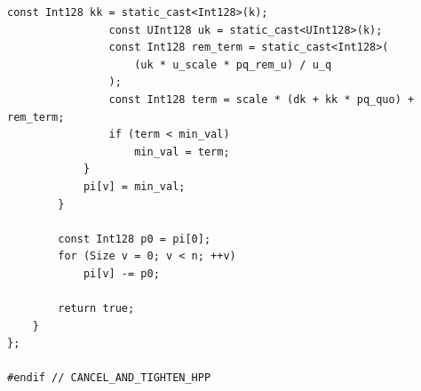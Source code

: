 \begin{lstlisting}[caption={Implementação em C++ do algoritmo \textit{Cancel-and-Tighten} com ordenação topológica em DAG admissível e aperto via algoritmo de Karp.}, label={lst:cancel_and_tighten}]
				const Int128 kk = static_cast<Int128>(k);
				const UInt128 uk = static_cast<UInt128>(k);
				const Int128 rem_term = static_cast<Int128>(
				    (uk * u_scale * pq_rem_u) / u_q
				);
				const Int128 term = scale * (dk + kk * pq_quo) + rem_term;
				if (term < min_val)
					min_val = term;
			}
			pi[v] = min_val;
		}

		const Int128 p0 = pi[0];
		for (Size v = 0; v < n; ++v)
			pi[v] -= p0;

		return true;
	}
};

#endif // CANCEL_AND_TIGHTEN_HPP
\end{lstlisting}
